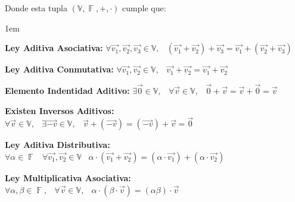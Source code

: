 \documentclass[12pt, fleqn]{report}                             %
\newenvironment{Indentation}[1][0.75em]                         %
        {\begin{adjustwidth}{#1}{}}                                 %
        {\end{adjustwidth}}                                         %
\DeclareMathOperator \Space {\quad}                             %
\DeclareMathOperator \MiniSpace {\;}                            %
\theoremstyle{break}                                            %
\DeclareMathOperator \GenericField {\mathbb{F}}                 %
\begin{document}
            \vspace{30pt}
            
            Donde esta tupla $(\mathbb{V}, \GenericField, +, \cdot)$ cumple que:
            
            \begin{Indentation}[1em]
            \begin{itemize}
            \small{
                
                \item 
                    \textbf{Ley Aditiva Asociativa:}
                    $\forall \vec{v_1}, \vec{v_2}, \vec{v_3} \in \mathbb{V}, \MiniSpace
                        (\vec{v_1} + \vec{v_2}) + \vec{v_3} = \vec{v_1} + (\vec{v_2} + \vec{v_3})$

                \item 
                    \textbf{Ley Aditiva Conmutativa:}
                    $\forall \vec{v_1}, \vec{v_2} \in \mathbb{V}, \MiniSpace
                            \vec{v_1} + \vec{v_2} = \vec{v_1} + \vec{v_2}$


                \item 
                    \textbf{Elemento Indentidad Aditivo:}
                    $\exists \vec{0} \in \mathbb{V}, \MiniSpace
                        \forall \vec{v} \in \mathbb{V}, \MiniSpace \vec{0} + \vec{v} = \vec{v} + \vec{0} = \vec{v}$

                \item 
                    \textbf{Existen Inversos Aditivos:}
                    $\forall \vec{v} \in \mathbb{V}, \MiniSpace
                            \exists \vec{-v} \in \mathbb{V}, \MiniSpace
                                \vec{v} + (\vec{-v}) = (\vec{-v}) + \vec{v} = \vec{0}$


                \item 
                    \textbf{Ley Aditiva Distributiva:}
                    $\forall \alpha \in \GenericField \MiniSpace
                        \forall \vec{v_1}, \vec{v_2} \in \mathbb{V} \MiniSpace
                            \alpha \cdot (\vec{v_1} + \vec{v_2}) = 
                                (\alpha \cdot \vec{v_1}) + (\alpha \cdot \vec{v_2})$

                \item 
                    \textbf{Ley Multiplicativa Asociativa:}
                    $\forall \alpha, \beta \in \GenericField, \MiniSpace
                        \forall \vec{v} \in \mathbb{V}, \MiniSpace
                            \alpha \cdot (\beta \cdot \vec{v}) = (\alpha \beta) \cdot \vec{v}$

}
\end{itemize}
\end{Indentation}
\end{document}
